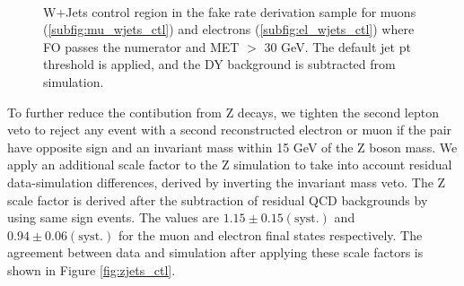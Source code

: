 \begin{figure}[!hbtp] 
\centering
{}
\\
\caption{W+Jets control region in the fake rate derivation sample 
for muons (\ref{subfig:mu_wjets_ctl}) and electrons (\ref{subfig:el_wjets_ctl})
where FO passes the numerator and MET $>$ 30 GeV. 
The default jet pt threshold is applied, and the DY background is subtracted from simulation.}
\label{fig:wjets_ctl} 
\end{figure}

To further reduce the contibution from Z decays, we tighten
the second lepton veto to reject any event with a second
reconstructed electron or muon if the pair have opposite
sign and an invariant mass within 15 GeV of the Z boson mass.
We apply an additional scale factor to the Z simulation
to take into account residual data-simulation differences,
derived by inverting the invariant mass veto.  The Z scale 
factor is derived after the subtraction of residual QCD backgrounds
by using same sign events.  The values are $1.15 \pm 0.15 \mathrm{(syst.)}$
and $0.94 \pm 0.06 \mathrm{(syst.)}$ for the muon and electron
final states respectively.  The agreement between data and simulation
after applying these scale factors is shown in Figure \ref{fig:zjets_ctl}.

